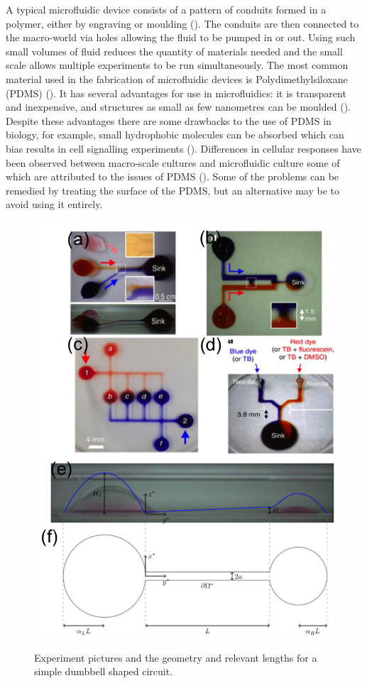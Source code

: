 \documentclass{jfm}
\begin{document}
 A typical  microfluidic device consists of a pattern of conduits formed  in a polymer, either by engraving or moulding (\cite{Nge2013AdvancesApplications}). 
 The conduits are then connected to the macro-world via holes  allowing the  fluid to be pumped in or out.   
 Using such small volumes of fluid reduces the quantity  of materials needed and the small scale allows multiple experiments to be run simultaneously.  
 The most common material used in the fabrication of microfluidic devices is  Polydimethylsiloxane  (PDMS) (\cite{Becker2008PolymerSystems}).
It has several advantages for use in microfluidics:  it is transparent and inexpensive,  and  structures as small  as  few nanometres can be moulded (\cite{Belanger2001HemocompatibilityReview.}). 
Despite these advantages there are some drawbacks to the use of PDMS in biology, for example,
 small hydrophobic  molecules can be absorbed which can bias results in cell signalling experiments (\cite{Toepke2006PDMSApplications}). 
Differences in cellular responses have been observed  between macro-scale cultures and microfluidic culture  some of which are attributed to the issues of PDMS (\cite{Paguirigan2009FromCultures}).
Some of the problems can be remedied  by treating the surface of the PDMS, but an alternative may be to avoid using it entirely.
 
\begin{figure} 
\centering
 {\includegraphics[width=0.8\linewidth]{Figures/Freestyle.png}}  
  \caption{ 
  Experiment pictures and the geometry and relevant lengths for a simple dumbbell  shaped circuit. 
} \label{fig: geometry}
\end{figure}
\end{document}
